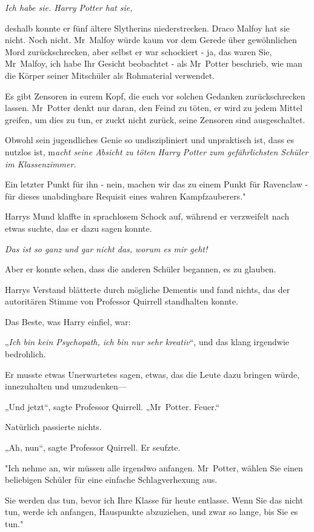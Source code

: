 {\emph{Ich habe sie. Harry Potter hat sie,}

deshalb konnte er fünf ältere Slytherins niederstrecken. Draco Malfoy hat sie nicht. Noch nicht. Mr~Malfoy würde kaum vor dem Gerede über gewöhnlichen Mord zurückschrecken, aber selbst er war schockiert - ja, das waren Sie, Mr~Malfoy, ich habe Ihr Gesicht beobachtet - als Mr~Potter beschrieb, wie man die Körper seiner Mitschüler als Rohmaterial verwendet.

Es gibt Zensoren in eurem Kopf, die euch vor solchen Gedanken zurückschrecken lassen. Mr~Potter denkt nur daran, den Feind zu töten, er wird zu jedem Mittel greifen, um dies zu tun, er zuckt nicht zurück, seine Zensoren sind ausgeschaltet.

Obwohl sein jugendliches Genie so undiszipliniert und unpraktisch ist, dass es nutzlos ist, m\emph{acht seine Absicht zu töten Harry Potter zum gefährlichsten Schüler im Klassenzimmer.}

Ein letzter Punkt für ihn - nein, machen wir das zu einem Punkt für Ravenclaw - für dieses unabdingbare Requisit eines wahren Kampfzauberers."

Harrys Mund klaffte in sprachlosem Schock auf, während er verzweifelt nach etwas suchte, das er dazu sagen konnte.

\emph{Das ist so ganz und gar nicht das, worum es mir geht!}

Aber er konnte sehen, dass die anderen Schüler begannen, es zu glauben.

Harrys Verstand blätterte durch mögliche Dementis und fand nichts, das der autoritären Stimme von Professor Quirrell standhalten konnte.

Das Beste, was Harry einfiel, war:

„\emph{Ich bin kein Psychopath, ich bin nur sehr kreativ}“, und das klang irgendwie bedrohlich.

Er musste etwas Unerwartetes sagen, etwas, das die Leute dazu bringen würde, innezuhalten und umzudenken—

„Und jetzt“, sagte Professor Quirrell. „Mr~Potter. Feuer.“

Natürlich passierte nichts.

„Ah, nun“, sagte Professor Quirrell. Er seufzte.

"Ich nehme an, wir müssen alle irgendwo anfangen. Mr~Potter, wählen Sie einen beliebigen Schüler für eine einfache Schlagverhexung aus.

Sie werden das tun, bevor ich Ihre Klasse für heute entlasse. Wenn Sie das nicht tun, werde ich anfangen, Hauspunkte abzuziehen, und zwar so lange, bis Sie es tun."

}
